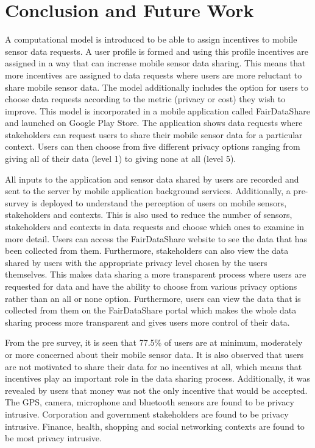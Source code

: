 \chapter{Conclusion and Future Work}

A computational model is introduced to be able to assign incentives to mobile sensor data requests. A user profile is formed and using this profile incentives are assigned in a way that can increase mobile sensor data sharing. This means that more incentives are assigned to data requests where users are more reluctant to share mobile sensor data. The model additionally includes the option for users to choose data requests according to the metric (privacy or cost) they wish to improve. This model is incorporated in a mobile application called FairDataShare and launched on Google Play Store. The application shows data requests where stakeholders can request users to share their mobile sensor data for a particular context. Users can then choose from five different privacy options ranging from giving all of their data (level 1) to giving none at all (level 5). 

All inputs to the application and sensor data shared by users are recorded and sent to the server by mobile application background services. Additionally, a pre-survey is deployed to understand the perception of users on mobile sensors, stakeholders and contexts. This is also used to reduce the number of sensors, stakeholders and contexts in data requests and choose which ones to examine in more detail. Users can access the FairDataShare website to see the data that has been collected from them. Furthermore, stakeholders can also view the data shared by users with the appropriate privacy level chosen by the users themselves. This makes data sharing a more transparent process where users are requested for data and have the ability to choose from various privacy options rather than an all or none option. Furthermore, users can view the data that is collected from them on the FairDataShare portal which makes the whole data sharing process more transparent and gives users more control of their data.

From the pre survey, it is seen that 77.5\% of users are at minimum, moderately or more concerned about their mobile sensor data. It is also observed that users are not motivated to share their data for no incentives at all, which means that incentives play an important role in the data sharing process. Additionally, it was revealed by users that money was not the only incentive that would be accepted. The GPS, camera, microphone and bluetooth sensors are found to be privacy intrusive. Corporation and government stakeholders are found to be privacy intrusive. Finance, health, shopping and social networking contexts are found to be most privacy intrusive.

